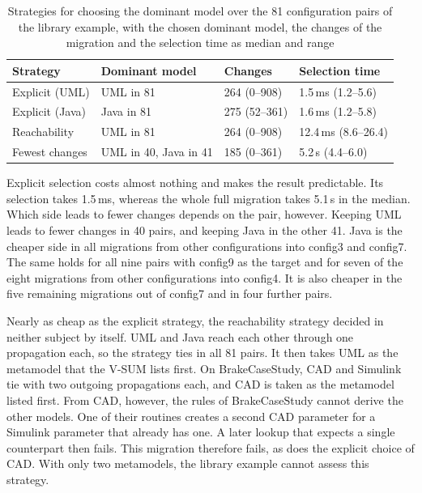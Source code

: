 \begin{table}[htbp]
    \centering
    \begin{tabular}{|l|l|l|l|}
        \hline
        \textbf{Strategy} & \textbf{Dominant model} & \textbf{Changes} & \textbf{Selection time} \\
        \hline
        Explicit (UML)    & UML in 81               & 264 (0--908)     & 1.5\,ms (1.2--5.6)      \\
        \hline
        Explicit (Java)   & Java in 81              & 275 (52--361)    & 1.6\,ms (1.2--5.8)      \\
        \hline
        Reachability      & UML in 81               & 264 (0--908)     & 12.4\,ms (8.6--26.4)    \\
        \hline
        Fewest changes    & UML in 40, Java in 41   & 185 (0--361)     & 5.2\,s (4.4--6.0)       \\
        \hline
    \end{tabular}
    \caption{Strategies for choosing the dominant model over the 81 configuration pairs of the library example, with the chosen dominant model, the changes of the migration and the selection time as median and range}
    \label{table:selection-strategies}
\end{table}

Explicit selection costs almost nothing and makes the result predictable.
Its selection takes 1.5\,ms, whereas the whole full migration takes 5.1\,s in the median.
Which side leads to fewer changes depends on the pair, however.
Keeping UML leads to fewer changes in 40 pairs, and keeping Java in the other 41.
Java is the cheaper side in all migrations from other configurations into config3 and config7.
The same holds for all nine pairs with config9 as the target and for seven of the eight migrations from other configurations into config4.
It is also cheaper in the five remaining migrations out of config7 and in four further pairs.

Nearly as cheap as the explicit strategy, the reachability strategy decided in neither subject by itself.
UML and Java reach each other through one propagation each, so the strategy ties in all 81 pairs.
It then takes UML as the metamodel that the V-SUM lists first.
On BrakeCaseStudy, CAD and Simulink tie with two outgoing propagations each, and CAD is taken as the metamodel listed first.
From CAD, however, the rules of BrakeCaseStudy cannot derive the other models.
One of their routines creates a second CAD parameter for a Simulink parameter that already has one.
A later lookup that expects a single counterpart then fails.
This migration therefore fails, as does the explicit choice of CAD.
With only two metamodels, the library example cannot assess this strategy.

